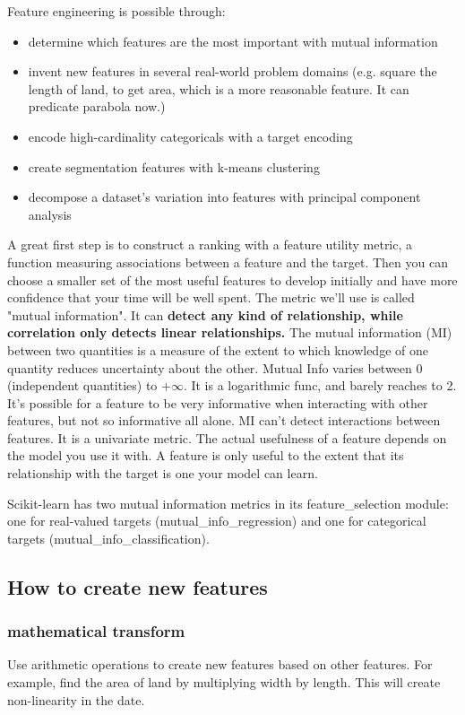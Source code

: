 \documentclass[12pt]{report}
\begin{document}
Feature engineering is possible through:
\begin{itemize}
  \item determine which features are the most important with mutual information
  \item invent new features in several real-world problem domains (e.g. square the length of land, to get area, which is a more reasonable feature. It can predicate parabola now.)
  \item encode high-cardinality categoricals with a target encoding
  \item create segmentation features with k-means clustering
  \item decompose a dataset's variation into features with principal component analysis
\end{itemize}

A great first step is to construct a ranking with a feature utility metric, a function measuring associations between a feature and the target. Then you can choose a smaller set of the most useful features to develop initially and have more confidence that your time will be well spent. The metric we'll use is called "mutual information". It can \textbf{detect any kind of relationship, while correlation only detects linear relationships.} The mutual information (MI) between two quantities is a measure of the extent to which knowledge of one quantity reduces uncertainty about the other. Mutual Info varies between 0 (independent quantities) to $+ \infty $. It is a logarithmic func, and barely reaches to 2. It's possible for a feature to be very informative when interacting with other features, but not so informative all alone. MI can't detect interactions between features. It is a univariate metric.
The actual usefulness of a feature depends on the model you use it with. A feature is only useful to the extent that its relationship with the target is one your model can learn.

Scikit-learn has two mutual information metrics in its feature\_selection module: one for real-valued targets (mutual\_info\_regression) and one for categorical targets (mutual\_info\_classification).

\subsection{How to create new features}

\subsubsection{mathematical transform}
Use arithmetic operations to create new features based on other features. For example, find the area of land by multiplying width by length. This will create non-linearity in the date.
\end{document}
